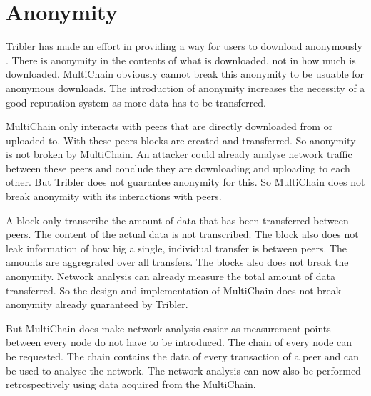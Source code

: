 \section{Anonymity}
Tribler has made an effort in providing a way for users to download anonymously
\cite{Plak-anonymous}\cite{ruigrok-anonymous}\cite{tanaskoski-anonymous}.
There is anonymity in the contents of what is downloaded, not in how much is downloaded.
MultiChain obviously cannot break this anonymity to be usuable for anonymous downloads.
The introduction of anonymity increases the necessity of a good reputation system as more data has to be transferred.

MultiChain only interacts with peers that are directly downloaded from or uploaded to.
With these peers blocks are created and transferred.
So anonymity is not broken by MultiChain.
An attacker could already analyse network traffic between these peers
and conclude they are downloading and uploading to each other.
But Tribler does not guarantee anonymity for this.
So MultiChain does not break anonymity with its interactions with peers.

A block only transcribe the amount of data that has been transferred between peers.
The content of the actual data is not transcribed.
The block also does not leak information of how big a single, individual transfer is between peers.
The amounts are aggregrated over all transfers.
The blocks also does not break the anonymity.
Network analysis can already measure the total amount of data transferred.
So the design and implementation of MultiChain does not break anonymity already guaranteed by Tribler.

But MultiChain does make network analysis easier as measurement points between every node do not have to be introduced.
The chain of every node can be requested.
The chain contains the data of every transaction of a peer and can be used to analyse the network.
The network analysis can now also be performed retrospectively using data acquired from the MultiChain.
